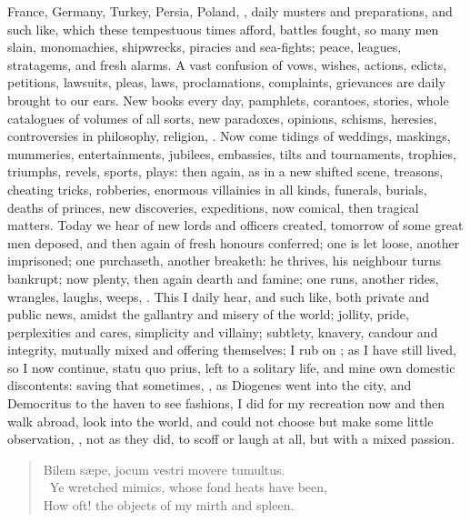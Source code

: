 {France, Germany, Turkey, Persia, Poland, \etc, daily musters and
preparations, and such like, which these tempestuous times afford,
battles fought, so many men slain, monomachies, shipwrecks, piracies
and sea-fights; peace, leagues, stratagems, and fresh alarms. A vast
confusion of vows, wishes, actions, edicts, petitions, lawsuits, pleas,
laws, proclamations, complaints, grievances are daily brought to our
ears. New books every day, pamphlets, corantoes, stories, whole
catalogues of volumes of all sorts, new paradoxes, opinions, schisms,
heresies, controversies in philosophy, religion, \etc. Now come tidings
of weddings, maskings, mummeries, entertainments, jubilees, embassies,
tilts and tournaments, trophies, triumphs, revels, sports, plays: then
again, as in a new shifted scene, treasons, cheating tricks, robberies,
enormous villainies in all kinds, funerals, burials, deaths of princes,
new discoveries, expeditions, now comical, then tragical matters. Today
we hear of new lords and officers created, tomorrow of some great men
deposed, and then again of fresh honours conferred; one is let loose,
another imprisoned; one purchaseth, another breaketh: he thrives, his
neighbour turns bankrupt; now plenty, then again dearth and famine; one
runs, another rides, wrangles, laughs, weeps, \etc. This I daily hear,
and such like, both private and public news, amidst the gallantry and
misery of the world; jollity, pride, perplexities and cares, simplicity
and villainy; subtlety, knavery, candour and integrity, mutually mixed
and offering themselves; I rub on ; as I have still
lived, so I now continue, statu quo prius, left to a solitary life, and
mine own domestic discontents: saving that sometimes, ,
as Diogenes went into the city, and Democritus to the haven to see
fashions, I did for my recreation now and then walk abroad, look into
the world, and could not choose but make some little observation, ,  not as they did, to
scoff or laugh at all, but with a mixed passion.

\begin{verse}
  Bilem s\ae{}pe, jocum vestri movere tumultus.\\
\
Ye wretched mimics, whose fond heats have been,\\
How oft! the objects of my mirth and spleen.
\end{verse}

}
